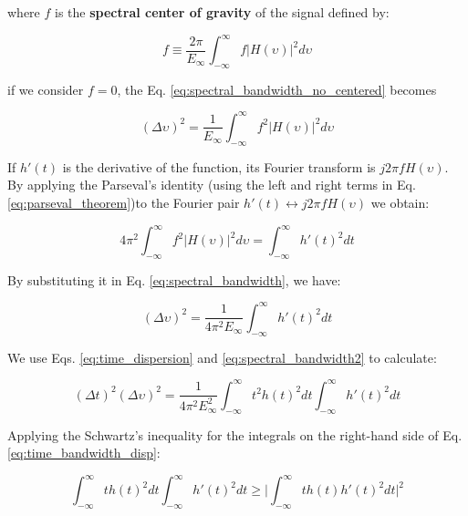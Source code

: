 where $f$ is the \textbf{spectral center of gravity} of the signal defined by:

\begin{equation}\label{eq:spectral_center_of_gravity}
    f \equiv  \frac{2 \pi}{E_{\infty}} \int_{-\infty}^{\infty} f |H(\upsilon)|^2 d\upsilon
\end{equation}

if we consider $f=0$, the Eq. \eqref{eq:spectral_bandwidth_no_centered} becomes

\begin{equation}\label{eq:spectral_bandwidth}
    (\Delta \upsilon)^2 = \frac{1}{E_{\infty}} \int_{-\infty}^{\infty} f^2 |H(\upsilon)|^2 d\upsilon 
\end{equation}

If $h'(t)$ is the derivative of the function, its Fourier transform is $j2\pi f H(\upsilon)$. By applying the Parseval's identity (using the left and right terms in Eq. \eqref{eq:parseval_theorem})to the Fourier pair $h'(t)\longleftrightarrow j2\pi f H(\upsilon)$ we obtain:

\begin{equation}\label{eq:applyed_parseval_theorem}
    4 \pi^{2} \int_{-\infty}^{\infty} f^2 |H(\upsilon)|^2 d\upsilon =  \int_{-\infty}^{\infty} h'(t)^2 dt
\end{equation}

By substituting it in Eq. \eqref{eq:spectral_bandwidth}, we have:

\begin{equation}\label{eq:spectral_bandwidth2}
    (\Delta \upsilon)^2 = \frac{1}{4 \pi^{2} E_{\infty}} \int_{-\infty}^{\infty} h'(t)^2 dt
\end{equation}

We use Eqs. \eqref{eq:time_dispersion} and \eqref{eq:spectral_bandwidth2} to calculate:

\begin{equation}\label{eq:time_bandwidth_disp}
    (\Delta t)^2(\Delta \upsilon)^2 = \frac{1}{4 \pi^{2} E_{\infty}^{2}} \int_{-\infty}^{\infty} t^2h(t)^2 dt \int_{-\infty}^{\infty}h'(t)^2 dt
\end{equation}

Applying the Schwartz's inequality for the integrals on the right-hand side of Eq. \eqref{eq:time_bandwidth_disp}:

\begin{equation}\label{eq:schwartz_inequality}
    \int_{-\infty}^{\infty}t h(t)^2 dt \int_{-\infty}^{\infty}h'(t)^2 dt  \geq \biggr\rvert \int_{-\infty}^{\infty}t h(t)h'(t)^2 dt \biggr\rvert^{2}
\end{equation}

